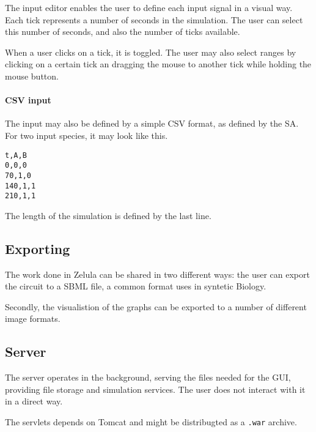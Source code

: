 \noindent The input editor enables the user to define each input signal in a visual way. Each tick represents a number of seconds in the simulation. The user can select this number of seconds, and also the number of ticks available.

When a user clicks on a tick, it is toggled. The user may also select ranges by clicking on a certain tick an dragging the mouse to another tick while holding the mouse button.

\paragraph{CSV input}
\begin{figure}[h!]
\centering{}
\end{figure}

\noindent The input may also be defined by a simple CSV format, as defined by the SA. For two input species, it may look like this. 
\begin{verbatim}
t,A,B
0,0,0
70,1,0
140,1,1
210,1,1
\end{verbatim}
The length of the simulation is defined by the last line.

\subsection{Exporting}
The work done in Zelula can be shared in two different ways: the user can export the circuit to a SBML file, a common format uses in syntetic Biology.

Secondly, the visualistion of the graphs can be exported to a number of different image formats.

\subsection{Server}
The server operates in the background, serving the files needed for the GUI, providing file storage and simulation services. The user does not interact with it in a direct way.

The servlets depends on Tomcat and might be distribugted as a \verb|.war| archive. 
